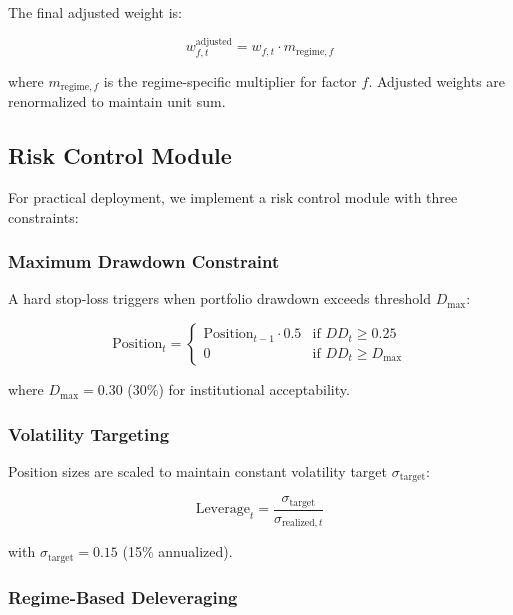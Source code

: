 The final adjusted weight is:

\begin{equation}
w_{f,t}^{\text{adjusted}} = w_{f,t} \cdot m_{\text{regime},f}
\end{equation}

where $m_{\text{regime},f}$ is the regime-specific multiplier for factor $f$. Adjusted weights are renormalized to maintain unit sum.

\subsection{Risk Control Module}

For practical deployment, we implement a risk control module with three constraints:

\subsubsection{Maximum Drawdown Constraint}

A hard stop-loss triggers when portfolio drawdown exceeds threshold $D_{\max}$:

\begin{equation}
\text{Position}_{t} = \begin{cases}
\text{Position}_{t-1} \cdot 0.5 & \text{if } DD_t \geq 0.25 \\
0 & \text{if } DD_t \geq D_{\max}
\end{cases}
\end{equation}

where $D_{\max} = 0.30$ (30\%) for institutional acceptability.

\subsubsection{Volatility Targeting}

Position sizes are scaled to maintain constant volatility target $\sigma_{\text{target}}$:

\begin{equation}
\text{Leverage}_t = \frac{\sigma_{\text{target}}}{\sigma_{\text{realized},t}}
\end{equation}

with $\sigma_{\text{target}} = 0.15$ (15\% annualized).

\subsubsection{Regime-Based Deleveraging}


